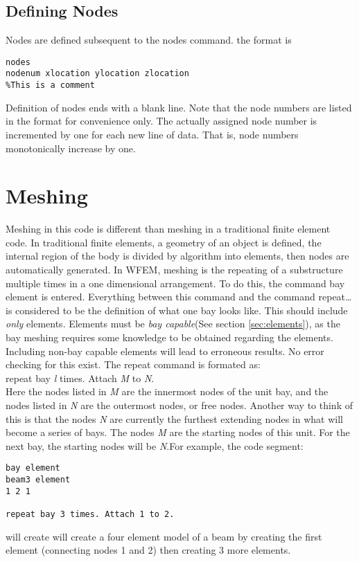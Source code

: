 \documentclass[12pt]{article}
\newcommand*{\sarg}[1]{\textit{#1}}
\newcommand*{\command}[1]{\textsf{#1}}
\newcommand*{\varg}[1]{\textit{#1}}
\begin{document}
\subsection{Defining Nodes}
\label{command:nodes}
Nodes are defined subsequent to the \command{nodes} command. the format is 
\begin{lstlisting}
nodes
nodenum xlocation ylocation zlocation
%This is a comment
\end{lstlisting}
Definition of nodes ends with a blank line. Note that the node numbers are listed in the format for convenience only. The actually assigned node number is incremented by one for each new line of data. That is, node numbers monotonically increase by one.

\section{Meshing}
Meshing in this code is different than meshing in a traditional finite element code. In traditional finite elements, a geometry of an object is defined, the internal region of the body is divided by algorithm into elements, then  nodes are automatically generated. In WFEM, meshing is the repeating of a substructure multiple times in a one dimensional arrangement. To do this, the command \command{bay element} is entered.  Everything between this command and the command \command{repeat\ldots} is considered to be the definition of what one bay looks like. This should include \emph{only} elements. Elements must be \emph{bay capable}(See section \ref{sec:elements}), as the bay meshing requires some knowledge to be obtained regarding the elements. Including non-bay capable elements will lead to erroneous results. No error checking for this exist. The \command{repeat} command is formated as:\\
 \command{repeat bay} \sarg{l} \command{ times. Attach } \varg{M}
 \command{to} \varg{N}.\\
\noindent Here the nodes listed in \varg{M} are the innermost nodes of the unit bay, and the nodes listed in \varg{N} are the outermost nodes, or free nodes. Another way to think of this is that the nodes \varg{N} are currently the furthest extending nodes in what will become a series of bays. The nodes \varg{M} are the starting nodes of this unit. For the next bay, the starting nodes will be \varg{N}.For example, the code segment:
\begin{lstlisting}
bay element
beam3 element
1 2 1

repeat bay 3 times. Attach 1 to 2. 
\end{lstlisting}
will create will create a four element model of a beam by creating the first element (connecting nodes 1 and 2) then creating 3 more elements. 
\end{document}

